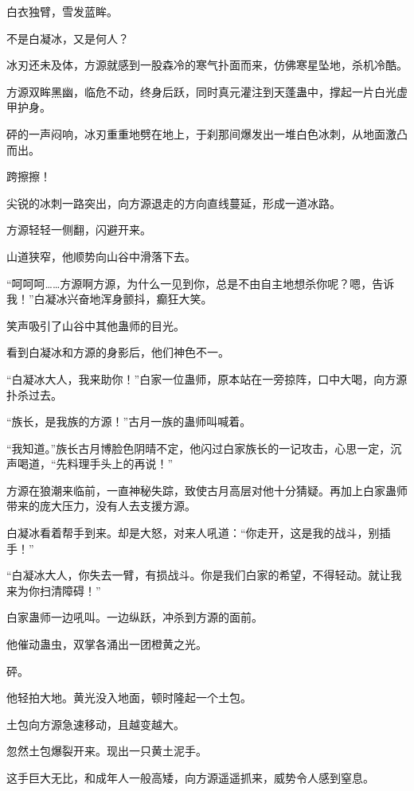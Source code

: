 
\begin{this_body}

白衣独臂，雪发蓝眸。

不是白凝冰，又是何人？

冰刃还未及体，方源就感到一股森冷的寒气扑面而来，仿佛寒星坠地，杀机冷酷。

方源双眸黑幽，临危不动，终身后跃，同时真元灌注到天蓬蛊中，撑起一片白光虚甲护身。

砰的一声闷响，冰刃重重地劈在地上，于刹那间爆发出一堆白色冰刺，从地面激凸而出。

跨擦擦！

尖锐的冰刺一路突出，向方源退走的方向直线蔓延，形成一道冰路。

方源轻轻一侧翻，闪避开来。

山道狭窄，他顺势向山谷中滑落下去。

“呵呵呵……方源啊方源，为什么一见到你，总是不由自主地想杀你呢？嗯，告诉我！”白凝冰兴奋地浑身颤抖，癫狂大笑。

笑声吸引了山谷中其他蛊师的目光。

看到白凝冰和方源的身影后，他们神色不一。

“白凝冰大人，我来助你！”白家一位蛊师，原本站在一旁掠阵，口中大喝，向方源扑杀过去。

“族长，是我族的方源！”古月一族的蛊师叫喊着。

“我知道。”族长古月博脸色阴晴不定，他闪过白家族长的一记攻击，心思一定，沉声喝道，“先料理手头上的再说！”

方源在狼潮来临前，一直神秘失踪，致使古月高层对他十分猜疑。再加上白家蛊师带来的庞大压力，没有人去支援方源。

白凝冰看着帮手到来。却是大怒，对来人吼道：“你走开，这是我的战斗，别插手！”

“白凝冰大人，你失去一臂，有损战斗。你是我们白家的希望，不得轻动。就让我来为你扫清障碍！”

白家蛊师一边吼叫。一边纵跃，冲杀到方源的面前。

他催动蛊虫，双掌各涌出一团橙黄之光。

砰。

他轻拍大地。黄光没入地面，顿时隆起一个土包。

土包向方源急速移动，且越变越大。

忽然土包爆裂开来。现出一只黄土泥手。

这手巨大无比，和成年人一般高矮，向方源遥遥抓来，威势令人感到窒息。


\end{this_body}
